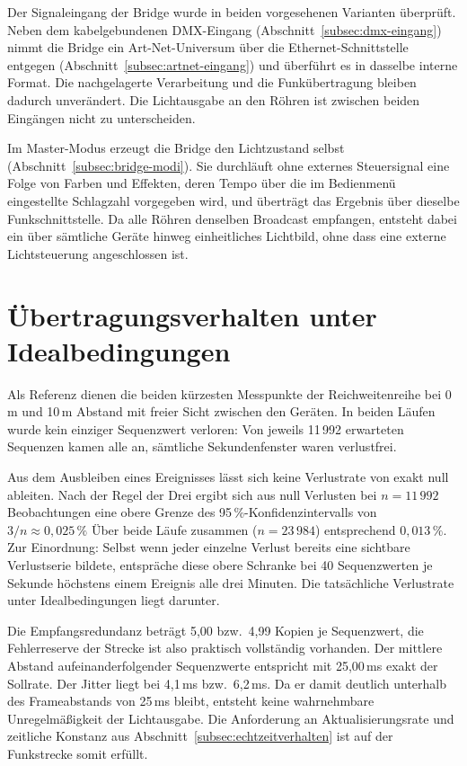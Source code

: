 Der Signaleingang der Bridge wurde in beiden vorgesehenen Varianten überprüft.
Neben dem kabelgebundenen DMX-Eingang (Abschnitt~\ref{subsec:dmx-eingang}) nimmt
die Bridge ein Art-Net-Universum über die Ethernet-Schnittstelle entgegen
(Abschnitt~\ref{subsec:artnet-eingang}) und überführt es in dasselbe interne
Format. Die nachgelagerte Verarbeitung und die Funkübertragung bleiben dadurch
unverändert. Die Lichtausgabe an den Röhren ist zwischen beiden Eingängen nicht
zu unterscheiden.

Im Master-Modus erzeugt die Bridge den Lichtzustand selbst
(Abschnitt~\ref{subsec:bridge-modi}). Sie durchläuft ohne externes Steuersignal
eine Folge von Farben und Effekten, deren Tempo über die im Bedienmenü
eingestellte Schlagzahl vorgegeben wird, und überträgt das Ergebnis über
dieselbe Funkschnittstelle. Da alle Röhren denselben Broadcast empfangen,
entsteht dabei ein über sämtliche Geräte hinweg einheitliches Lichtbild, ohne
dass eine externe Lichtsteuerung angeschlossen ist.

\section{Übertragungsverhalten unter Idealbedingungen}
\label{sec:idealbedingungen}

Als Referenz dienen die beiden kürzesten Messpunkte der Reichweitenreihe bei
0\,m und 10\,m Abstand mit freier Sicht zwischen den Geräten. In beiden Läufen
wurde kein einziger Sequenzwert verloren: Von jeweils 11\,992 erwarteten
Sequenzen kamen alle an, sämtliche Sekundenfenster waren verlustfrei.

Aus dem Ausbleiben eines Ereignisses lässt sich keine Verlustrate von exakt null
ableiten. Nach der Regel der Drei ergibt sich aus null Verlusten bei
$n = 11\,992$ Beobachtungen eine obere Grenze des 95\,\%-Konfidenzintervalls von
$3/n \approx 0{,}025\,\%$ Über beide Läufe zusammen ($n = 23\,984$) entsprechend
$0{,}013\,\%$. Zur Einordnung: Selbst wenn jeder einzelne Verlust bereits eine
sichtbare Verlustserie bildete, entspräche diese obere Schranke bei 40
Sequenzwerten je Sekunde höchstens einem Ereignis alle drei Minuten. Die
tatsächliche Verlustrate unter Idealbedingungen liegt darunter.

Die Empfangsredundanz beträgt 5,00 bzw.\ 4,99 Kopien je Sequenzwert, die
Fehlerreserve der Strecke ist also praktisch vollständig vorhanden. Der mittlere
Abstand aufeinanderfolgender Sequenzwerte entspricht mit 25,00\,ms exakt der
Sollrate. Der Jitter liegt bei 4,1\,ms bzw.\ 6,2\,ms. Da er damit deutlich
unterhalb des Frameabstands von 25\,ms bleibt, entsteht keine wahrnehmbare
Unregelmäßigkeit der Lichtausgabe. Die Anforderung an Aktualisierungsrate und
zeitliche Konstanz aus Abschnitt~\ref{subsec:echtzeitverhalten} ist auf der
Funkstrecke somit erfüllt.

